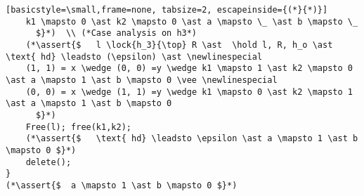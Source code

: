 \documentclass[8pt]{article}
\newcommand{\lock}[2]{ \square \hspace{-1ex} \xrightarrow[#1]{#2}}
\newcommand{\hold}{\text{Hold }}
\newcommand{\assert}[1]{\textcolor{blue}{ \{ #1 \}  } }
\newcommand{\newlinespecial}{\newline \hphantom{100pt}}
\begin{document}
\begin{lstlisting}[basicstyle=\small,frame=none, tabsize=2, escapeinside={(*}{*)}]
	k1 \mapsto 0 \ast k2 \mapsto 0 \ast a \mapsto \_ \ast b \mapsto \_
	  $}*)  \\ (*Case analysis on h3*)
	(*\assert{$   l \lock{h_3}{\top} R \ast  \hold l, R, h_o \ast  \text{ hd} \leadsto (\epsilon) \ast \newlinespecial
	(1, 1) = x \wedge (0, 0) =y \wedge k1 \mapsto 1 \ast k2 \mapsto 0 \ast a \mapsto 1 \ast b \mapsto 0 \vee \newlinespecial
	(0, 0) = x \wedge (1, 1) =y \wedge k1 \mapsto 0 \ast k2 \mapsto 1 \ast a \mapsto 1 \ast b \mapsto 0
	  $}*)
	Free(l); free(k1,k2);
	(*\assert{$   \text{ hd} \leadsto \epsilon \ast a \mapsto 1 \ast b \mapsto 0 $}*)
	delete();
}
(*\assert{$  a \mapsto 1 \ast b \mapsto 0 $}*)
	
\end{lstlisting}







\newpage
\end{document}
